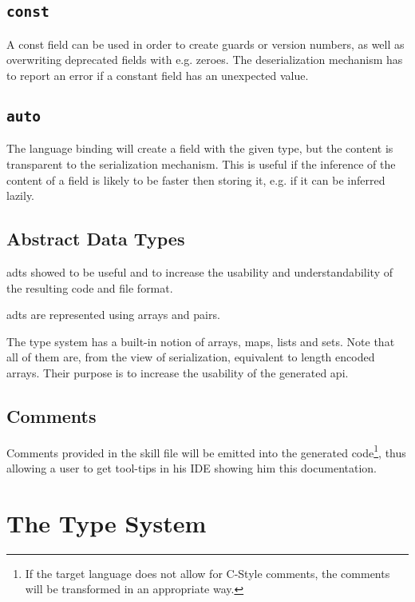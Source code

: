\subsection{\texttt{const}}
A const field can be used in order to create guards or version numbers, as well as overwriting deprecated fields with e.g. zeroes. The deserialization mechanism has to report an error if a constant field has an unexpected value.

\subsection{\texttt{auto}}
The language binding will create a field with the given type, but the content is transparent to the serialization mechanism. This is useful if the inference of the content of a field is likely to be faster then storing it, e.g. if it can be inferred lazily.

\subsection{Abstract Data Types}

\glspl{adt} showed to be useful and to increase the usability and understandability of the resulting code and file format.

\glspl{adt} are represented using arrays and pairs. 

The type system has a built-in notion of arrays, maps, lists and sets. Note that all of them are, from the view of serialization, equivalent to length encoded arrays. Their purpose is to increase the usability of the generated \gls{api}.


\subsection{Comments}
Comments provided in the skill file will be emitted into the generated code\footnote{If the target language does not allow for C-Style comments, the comments will be transformed in an appropriate way.}, thus allowing a user to get tool-tips in his IDE showing him this documentation. 



\section{The Type System}

